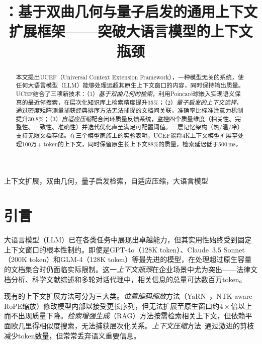 \documentclass[journal]{IEEEtran}
\title{\ucef{}：基于双曲几何与量子启发的通用上下文扩展框架——突破大语言模型的上下文瓶颈}
\author{
  \IEEEauthorblockN{何红林}
  \IEEEauthorblockA{\\}
  \IEEEauthorblockA{hehonglin525@gmail.com}
  \IEEEauthorblockA{项目主页：\url{https://github.com/ViewWay/UCEF}}
}
\newcommand{\ucef}{\textsf{UCEF}}
\begin{document}
\maketitle

\begin{abstract}
本文提出\ucef{}（Universal Context Extension Framework），一种模型无关的系统，使任何大语言模型（LLM）能够处理远超其原生上下文窗口的内容，同时保持输出质量。
\ucef{}结合了三项新技术：（1）\emph{基于双曲几何的检索}，利用Poincar\'{e}球嵌入实现语义保真的最近邻搜索，在层次化知识库上检索精度提升35\%；（2）\emph{量子启发的上下文选择}，通过密度矩阵测量捕获经典排序方法无法捕捉的文档间关联，准确率比标准注意力机制提升30.8\%；（3）\emph{自适应压缩}配合闭环质量反馈系统，监控四个质量维度（相关性、完整性、一致性、准确性）并迭代优化直至满足可配置阈值。三层记忆架构（热/温/冷）支持无限文档存储。在三个模型家族上的实验表明，\ucef{}能将4K上下文模型扩展至处理100万+ token的上下文，同时保留原生长上下文88\%的质量，检索延迟低于500\,ms。
\end{abstract}

\begin{IEEEkeywords}
上下文扩展，双曲几何，量子启发检索，自适应压缩，大语言模型
\end{IEEEkeywords}

\section{引言}
\label{sec:intro}

大语言模型（LLM）已在各类任务中展现出卓越能力，但其实用性始终受到固定上下文窗口的根本性制约。即使是GPT-4o（128K token）、Claude~3.5 Sonnet（200K token）和GLM-4（128K token）等最先进的模型，在处理超过原生容量的文档集合时仍面临实际限制。这一\emph{上下文瓶颈}在企业场景中尤为突出——法律文档分析、科学文献综述和多轮对话代理中，相关信息的总量可达数百万token。

现有的上下文扩展方法可分为三大类。\emph{位置编码缩放}方法（YaRN~\cite{peng2024yarn}，NTK-aware RoPE缩放）修改模型内部以接受更长序列，但无法扩展至原生窗口约$4\times$倍以上而不出现质量下降。\emph{检索增强生成}（RAG）方法按需检索相关上下文，但依赖平面欧几里得相似度搜索，无法捕获层次化关系。\emph{上下文压缩}方法~\cite{jiang2024longllmlingua,li2026ata}通过激进的剪枝减少token数量，但常常丢弃语义重要信息。
\end{document}
